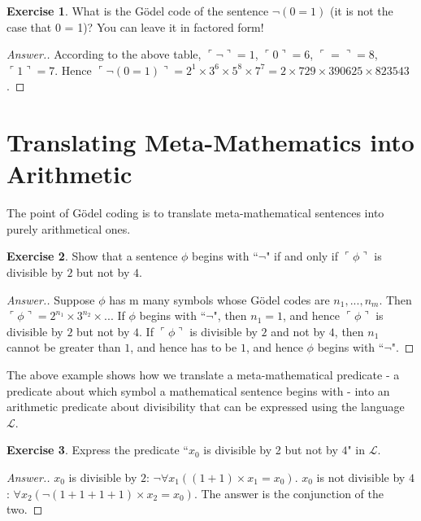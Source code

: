 \documentclass[11pt]{article}
\theoremstyle{definition}
\newtheorem{exer}{Exercise}
\begin{document}
\begin{exer}
What is the G\"odel code of the sentence $\neg (0=1)$ (it is not the case that 0 = 1)? You can leave it in factored form!
\end{exer}

\begin{proof}[Answer.]
According to the above table, $\ulcorner \neg \urcorner = 1$, $\ulcorner 0 \urcorner = 6$, $\ulcorner = \urcorner = 8$, $\ulcorner 1 \urcorner = 7$. Hence $\ulcorner \neg (0=1) \urcorner = 2^1 \times 3^6 \times 5^8 \times 7^7 = 2 \times 729 \times 390625 \times 823543$.

\end{proof}

\section{Translating Meta-Mathematics into Arithmetic}

The point of G\"odel coding is to translate meta-mathematical sentences into purely arithmetical ones.

\begin{exer}
Show that a sentence $\phi$ begins with ``$\neg$" if and only if $\ulcorner \phi \urcorner$ is divisible by $2$ but not by $4$.
\end{exer}

\begin{proof}[Answer.]
Suppose $\phi$ has m many symbols whose G\"odel codes are $n_1, ..., n_m$. Then $\ulcorner \phi \urcorner = 2^{n_1} \times 3^{n_2} \times ...$ If $\phi$ begins with ``$\neg$",  then $n_1 = 1$, and hence $\ulcorner \phi \urcorner$ is divisible by $2$ but not by $4$. If $\ulcorner \phi \urcorner$ is divisible by $2$ and not by $4$, then $n_1$ cannot be greater than $1$, and hence has to be $1$, and hence $\phi$ begins with ``$\neg$".

\end{proof}

The above example shows how we translate a meta-mathematical predicate - a predicate about which symbol a mathematical sentence begins with - into an arithmetic predicate about divisibility that can be expressed using the language $\mathscr{L}$.

\begin{exer}
Express the predicate ``$x_0$ is divisible by 2 but not by $4$" in $\mathscr{L}$.
\end{exer}

\begin{proof}[Answer.]
$x_0$ is divisible by $2$: $\neg \forall x_1 ((1+1) \times x_1 = x_0)$. $x_0$ is not divisible by $4$: $\forall x_2 (\neg (1+1+1+1) \times x_2 = x_0)$. The answer is the conjunction of the two.

\end{proof}
\end{document}
